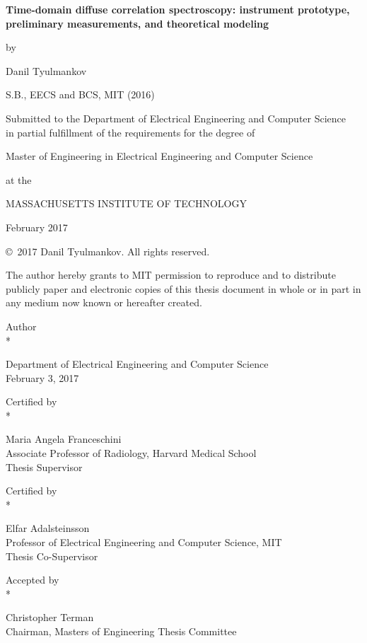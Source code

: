 \def\signature#1#2{\par\noindent#1\dotfill\null\\*{\raggedleft #2\par}}


\begin{titlepage}   
{\Large\bf Time-domain diffuse correlation spectroscopy: instrument prototype, preliminary measurements, and theoretical modeling  \par}
by\par
{\Large  Danil Tyulmankov}
\par
S.B., EECS and BCS, MIT (2016)
\par
Submitted to the Department of Electrical Engineering and Computer Science \\
in partial fulfillment of the requirements for the degree of
\par
Master of Engineering in Electrical Engineering and Computer Science
\par
at the
\par
MASSACHUSETTS INSTITUTE OF TECHNOLOGY
\par
February 2017
\par
\copyright\ 2017 Danil Tyulmankov.  All rights reserved.
\par
The author hereby grants to MIT permission to reproduce and to distribute publicly paper and electronic copies of this thesis document in whole or in part in any medium now known or hereafter created.
\baselineskip
\signature{Author}{Department of Electrical Engineering and Computer Science \\ February 3, 2017}
\par
\signature{Certified by}{Maria Angela Franceschini \\ Associate Professor of Radiology, Harvard Medical School\\ Thesis Supervisor}
\par
\signature{Certified by}{Elfar Adalsteinsson \\ Professor of Electrical Engineering and Computer Science, MIT \\ Thesis Co-Supervisor}
\par
\signature{Accepted by}{Christopher Terman \\ Chairman, Masters of Engineering Thesis Committee}
\vfill
\end{titlepage}


